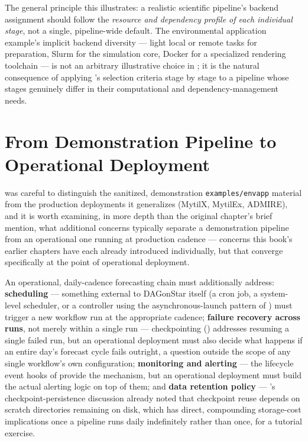 \begin{practicebox}
The general principle this illustrates: a realistic scientific pipeline's
backend assignment should follow the \emph{resource and dependency profile
of each individual stage}, not a single, pipeline-wide default. The
environmental application example's implicit backend diversity --- light
local or remote tasks for preparation, Slurm for the simulation core, Docker
for a specialized rendering toolchain --- is not an arbitrary illustrative
choice in ; it is the natural consequence of applying
's selection criteria stage by stage to a
pipeline whose stages genuinely differ in their computational and
dependency-management needs.
\end{practicebox}

\section{From Demonstration Pipeline to Operational Deployment}

 was careful to distinguish the sanitized, demonstration
\texttt{examples/envapp} material from the production deployments it
generalizes (MytilX, MytilEx, ADMIRE), and it is worth examining, in more
depth than the original chapter's brief mention, what additional concerns
typically separate a demonstration pipeline from an operational one running
at production cadence --- concerns this book's earlier chapters have each
already introduced individually, but that converge specifically at the
point of operational deployment.

An operational, daily-cadence forecasting chain must additionally address:
\textbf{scheduling} --- something external to DAGonStar itself (a cron job,
a system-level scheduler, or a controller using the asynchronous-launch
pattern of ) must trigger a new workflow run at the
appropriate cadence; \textbf{failure recovery across runs}, not merely
within a single run --- checkpointing () addresses
resuming a single failed run, but an operational deployment must also
decide what happens if an entire day's forecast cycle fails outright, a
question outside the scope of any single workflow's own configuration;
\textbf{monitoring and alerting} --- the lifecycle event hooks of
 provide the mechanism, but an operational deployment
must build the actual alerting logic on top of them; and \textbf{data
retention policy} --- 's checkpoint-persistence
discussion already noted that checkpoint reuse depends on scratch
directories remaining on disk, which has direct, compounding storage-cost
implications once a pipeline runs daily indefinitely rather than once, for
a tutorial exercise.

